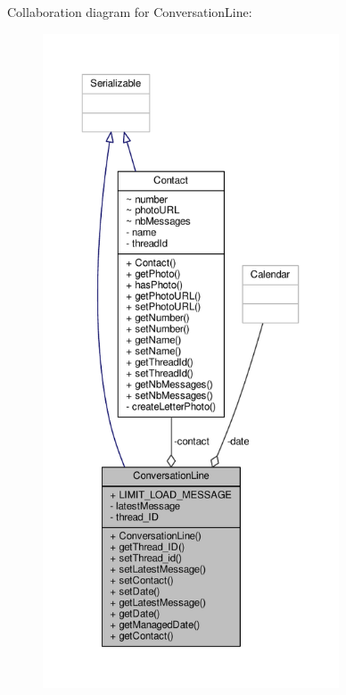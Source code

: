 Collaboration diagram for Conversation\+Line\+:
\nopagebreak
\begin{figure}[H]
\begin{center}
\leavevmode
\includegraphics[height=550pt]{a00069}
\end{center}
\end{figure}

